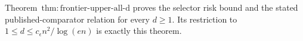 Theorem~\(\mathrm{thm:frontier\text{-}upper\text{-}all\text{-}d}\) proves the selector risk bound and the stated published-comparator relation for every \(d\ge1\).  Its restriction to \(1\le d\le c_{\epsilon}n^2/\log(en)\) is exactly this theorem.